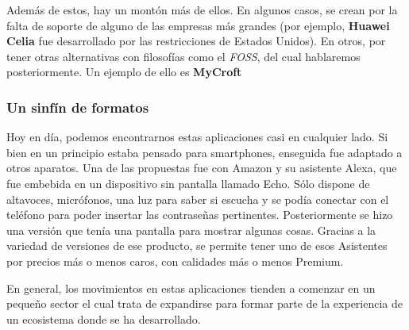 Además de estos, hay un montón más de ellos. En algunos casos, se crean por la falta de soporte de alguno de las empresas más grandes (por ejemplo, \textbf{Huawei Celia} fue desarrollado por las restricciones de Estados Unidos). En otros, por tener otras alternativas con filosofías como el \textit{FOSS}, del cual hablaremos posteriormente. Un ejemplo de ello es \textbf{MyCroft}


\subsubsection{Un sinfín de formatos}
Hoy en día, podemos encontrarnos estas aplicaciones casi en cualquier lado. Si bien en un principio estaba pensado para smartphones, enseguida fue adaptado a otros aparatos.
Una de las propuestas fue con Amazon y su asistente Alexa, que fue embebida en un dispositivo sin pantalla llamado Echo. Sólo dispone de altavoces, micrófonos, una luz para saber si escucha y se podía conectar con el teléfono para poder insertar las contraseñas pertinentes. Posteriormente se hizo una versión que tenía una pantalla para mostrar algunas cosas.
Gracias a la variedad de versiones de ese producto, se permite tener uno de esos Asistentes por precios más o menos caros, con calidades más o menos Premium.

En general, los movimientos en estas aplicaciones tienden a comenzar en un pequeño sector el cual trata de expandirse para formar parte de la experiencia de un ecosistema donde se ha desarrollado.

